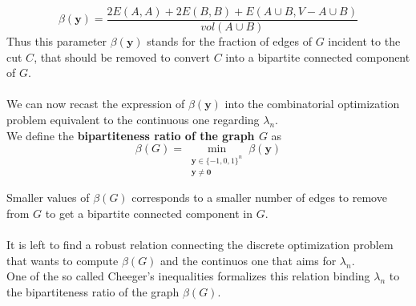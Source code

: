 \[ \beta(\mathbf{y}) = \frac{2E(A,A) + 2E(B,B) + E(A \cup B, V - A \cup B)}{vol(A \cup B)} \]
Thus this parameter $ \beta(\mathbf{y}) $ stands for the fraction of edges of $ G $ incident to the cut $ C $, that should be removed to convert $ C $ into a bipartite connected component of $ G $.
\\ \\
We can now recast the expression of $ \beta(\mathbf{y}) $ into the combinatorial optimization problem equivalent to the continuous one regarding $ \lambda_n $.\\
We define the \textbf{bipartiteness ratio of the graph $ G $} as
\[ \beta(G) = \min_{\substack{\mathbf{y} \in \{-1,0,1\}^n \\ \mathbf{y} \ne \mathbf{0}}} \beta(\mathbf{y}) \]

Smaller values of $ \beta(G) $ corresponds to a smaller number of edges to remove from $ G $ to get a bipartite connected component in $ G $. 
\\
\\
It is left to find a robust relation connecting the discrete optimization problem that wants to compute $ \beta(G) $ and the continuos one that aims for $ \lambda_n $.\\
One of the so called Cheeger's inequalities formalizes this relation binding $ \lambda_n $ to the bipartiteness ratio of the graph $ \beta(G) $.

